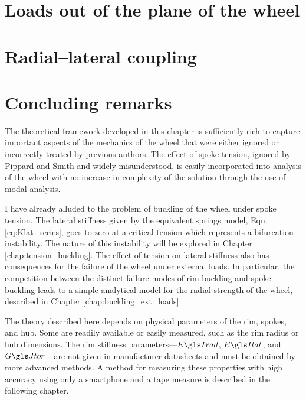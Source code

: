 \documentclass[\rootdir/thesis.tex]{subfiles}
\begin{document}
\section{Loads out of the plane of the wheel}
\label{sec:Lateral}


\section{Radial--lateral coupling}
\label{sec:coupling}



\section{Concluding remarks}

The theoretical framework developed in this chapter is sufficiently rich to capture important aspects of the mechanics of the wheel that were either ignored or incorrectly treated by previous authors. The effect of spoke tension, ignored by Pippard and Smith and widely misunderstood, is easily incorporated into analysis of the wheel with no increase in complexity of the solution through the use of modal analysis.

I have already alluded to the problem of buckling of the wheel under spoke tension. The lateral stiffness given by the equivalent springs model, Eqn. \ref{eq:Klat_series}, goes to zero at a critical tension which represents a bifurcation instability. The nature of this instability will be explored in Chapter \ref{chap:tension_buckling}. The effect of tension on lateral stiffness also has consequences for the failure of the wheel under external loads. In particular, the competition between the distinct failure modes of rim buckling and spoke buckling leads to a simple analytical model for the radial strength of the wheel, described in Chapter \ref{chap:buckling_ext_loads}.

The theory described here depends on physical parameters of the rim, spokes, and hub. Some are readily available or easily measured, such as the rim radius or hub dimensions. The rim stiffness parameters---$\EIr$, $\EIl$, and $\GJ$---are not given in manufacturer datasheets and must be obtained by more advanced methods. A method for measuring these properties with high accuracy using only a smartphone and a tape measure is described in the following chapter.
\end{document}
